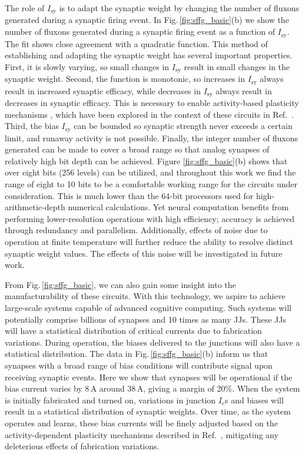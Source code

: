 \documentclass[twocolumn]{article}
\newcommand{\onlinecite}[1]{\hspace{-1 ex} \nocite{#1}\citenum{#1}}
\begin{document}
The role of $I_{\mathrm{sy}}$ is to adapt the synaptic weight by changing the number of fluxons generated during a synaptic firing event. In Fig.\,\ref{fig:sffg_basic}(b) we show the number of fluxons generated during a synaptic firing event as a function of $I_{\mathrm{sy}}$. The fit shows close agreement with a quadratic function. This method of establishing and adapting the synaptic weight has several important properties. First, it is slowly varying, so small changes in $I_{\mathrm{sy}}$ result in small changes in the synaptic weight. Second, the function is monotonic, so increases in $I_{\mathrm{sy}}$ always result in increased synaptic efficacy, while decreases in $I_{\mathrm{sy}}$ always result in decreases in synaptic efficacy. This is necessary to enable activity-based plasticity mechanisms \cite{somi2000,mage2012}, which have been explored in the context of these circuits in Ref.\,\onlinecite{sh2018_full}. Third, the bias $I_{\mathrm{sy}}$ can be bounded so synaptic strength never exceeds a certain limit, and runaway activity is not possible. Finally, the integer number of fluxons generated can be made to cover a broad range so that analog synapses of relatively high bit depth can be achieved. Figure \ref{fig:sffg_basic}(b) shows that over eight bits (256 levels) can be utilized, and throughout this work we find the range of eight to 10 bits to be a comfortable working range for the circuits under consideration. This is much lower than the 64-bit processors used for high-arithmetic-depth numerical calculations. Yet neural computation benefits from performing lower-resolution operations with high efficiency; accuracy is achieved through redundancy and parallelism. Additionally, effects of noise due to operation at finite temperature will further reduce the ability to resolve distinct synaptic weight values. The effects of this noise will be investigated in future work.

From Fig.\,\ref{fig:sffg_basic}, we can also gain some insight into the manufacturability of these circuits. With this technology, we aspire to achieve large-scale systems capable of advanced cognitive computing. Such systems will potentially comprise billions of synapses and 10 times as many JJs. These JJs will have a statistical distribution of critical currents due to fabrication variations. During operation, the biases delivered to the junctions will also have a statistical distribution. The data in Fig.\,\ref{fig:sffg_basic}(b) inform us that synapses with a broad range of bias conditions will contribute signal upon receiving synaptic events. Here we show that synapses will be operational if the bias current varies by 8\,\textmu A around 38\,\textmu A, giving a margin of 20\%. When the system is initially fabricated and turned on, variations in junction $I_{\mathrm{c}}$s and biases will result in a statistical distribution of synaptic weights. Over time, as the system operates and learns, these bias currents will be finely adjusted based on the activity-dependent plasticity mechanisms described in Ref.\,\onlinecite{sh2018_full}, mitigating any deleterious effects of fabrication variations.
\end{document}
